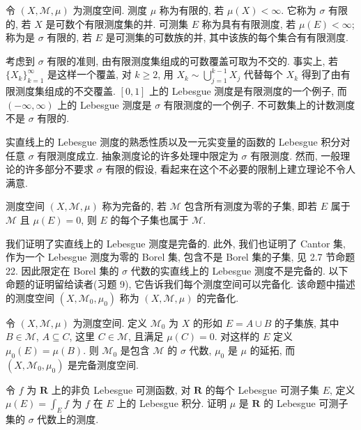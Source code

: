 \documentclass[../../main.tex]{subfiles}
\begin{document}
\begin{definition}\label{definition:ch17-finite-sigma-finite}
令 $(X,\mathcal{M},\mu)$ 为测度空间. 测度 $\mu$ 称为有限的, 若 $\mu(X)<\infty$. 它称为 $\sigma$ 有限的, 若 $X$ 是可数个有限测度集的并. 可测集 $E$ 称为具有有限测度, 若 $\mu(E)<\infty$; 称为是 $\sigma$ 有限的, 若 $E$ 是可测集的可数族的并, 其中该族的每个集合有有限测度.
\end{definition}

考虑到 $\sigma$ 有限的准则, 由有限测度集组成的可数覆盖可取为不交的. 事实上, 若 $\{X_{k}\}_{k=1}^{\infty}$ 是这样一个覆盖, 对 $k\geqslant 2$, 用 $X_{k}\sim\bigcup_{j=1}^{k-1}X_{j}$ 代替每个 $X_{k}$ 得到了由有限测度集组成的不交覆盖. $[0,1]$ 上的 Lebesgue 测度是有限测度的一个例子, 而 $(-\infty,\infty)$ 上的 Lebesgue 测度是 $\sigma$ 有限测度的一个例子. 不可数集上的计数测度不是 $\sigma$ 有限的.

实直线上的 Lebesgue 测度的熟悉性质以及一元实变量的函数的 Lebesgue 积分对任意 $\sigma$ 有限测度成立. 抽象测度论的许多处理中限定为 $\sigma$ 有限测度. 然而, 一般理论的许多部分不要求 $\sigma$ 有限的假设, 看起来在这个不必要的限制上建立理论不令人满意.

\begin{definition}[完备测度空间]\label{definition:ch17-complete}
测度空间 $(X,\mathcal{M},\mu)$ 称为完备的, 若 $\mathcal{M}$ 包含所有测度为零的子集, 即若 $E$ 属于 $\mathcal{M}$ 且 $\mu(E)=0$, 则 $E$ 的每个子集也属于 $\mathcal{M}$.
\end{definition}

我们证明了实直线上的 Lebesgue 测度是完备的. 此外, 我们也证明了 Cantor 集, 作为一个 Lebesgue 测度为零的 Borel 集, 包含不是 Borel 集的子集, 见 2.7 节命题 22. 因此限定在 Borel 集的 $\sigma$ 代数的实直线上的 Lebesgue 测度不是完备的. 以下命题的证明留给读者(习题 9), 它告诉我们每个测度空间可以完备化. 该命题中描述的测度空间 $(X,\mathcal{M}_{0},\mu_{0})$ 称为 $(X,\mathcal{M},\mu)$ 的完备化.

\begin{proposition}\label{proposition:ch17-completion}
令 $(X,\mathcal{M},\mu)$ 为测度空间. 定义 $\mathcal{M}_{0}$ 为 $X$ 的形如 $E=A\cup B$ 的子集族, 其中 $B\in\mathcal{M}$, $A\subseteq C$, 这里 $C\in\mathcal{M}$, 且满足 $\mu(C)=0$. 对这样的 $E$ 定义 $\mu_{0}(E)=\mu(B)$. 则 $\mathcal{M}_{0}$ 是包含 $\mathcal{M}$ 的 $\sigma$ 代数, $\mu_{0}$ 是 $\mu$ 的延拓, 而 $(X,\mathcal{M}_{0},\mu_{0})$ 是完备测度空间.
\end{proposition}

\begin{exercise}\label{exercise:ch17-01}
令 $f$ 为 $\mathbf{R}$ 上的非负 Lebesgue 可测函数, 对 $\mathbf{R}$ 的每个 Lebesgue 可测子集 $E$, 定义 $\mu(E)=\int_{E}f$ 为 $f$ 在 $E$ 上的 Lebesgue 积分. 证明 $\mu$ 是 $\mathbf{R}$ 的 Lebesgue 可测子集的 $\sigma$ 代数上的测度.
\end{exercise}
\end{document}
